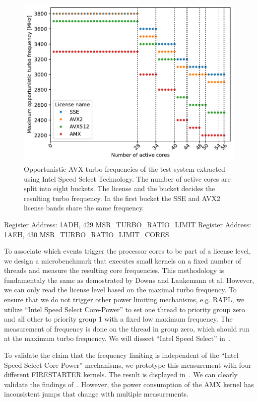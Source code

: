 \begin{figure}[]
    \centering
    \includegraphics[width=0.8\columnwidth]{fig/avx-frequency-license-bands.pdf}
    \caption{\label{fig:p0n-frequencies}Opportunistic AVX turbo frequencies of the test system extracted using Intel Speed Select Technology.
    The number of active cores are split into eight buckets. The license and the bucket decides the resulting turbo frequency.
    In the first bucket the SSE and AVX2 license bands share the same frequency.}
\end{figure}

Register Address: 1ADH, 429 MSR\_TURBO\_RATIO\_LIMIT
Register Address: 1AEH, 430 MSR\_TURBO\_RATIO\_LIMIT\_CORES

To associate which events trigger the processor cores to be part of a license level, we design a microbenchmark that executes small kernels on a fixed number of threads and measure the resulting core frequencies.
This methodology is fundamentaly the same as demostrated by Downs and Laukemann et al.
However, we can only read the license level based on the maximal turbo frequency.
To ensure that we do not trigger other power limiting mechanisms, e.g. RAPL, we utilize ``Intel Speed Select Core-Power'' to set one thread to priority group zero and all other to priority group 1 with a fixed low maximum frequency.
The measurement of frequency is done on the thread in group zero, which should run at the maximum turbo frequency.
We will dissect ``Intel Speed Select'' in~.

To validate the claim that the frequency limiting is independent of the ``Intel Speed Select Core-Power'' mechanisms, we prototype this measurement with four different FIRESTARTER kernels.
The result is displayed in~. We can clearly validate the findings of~.
However, the power consumption of the AMX kernel has inconsistent jumps that change with multiple measurements.


